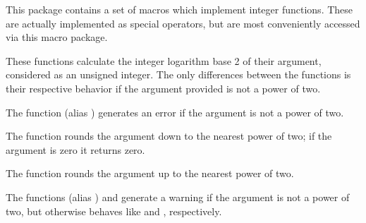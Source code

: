 
This package contains a set of macros which implement integer
functions. These are actually implemented as special operators, but
are most conveniently accessed via this macro package.


These functions calculate the integer logarithm base 2 of their
argument, considered as an unsigned integer. The only differences
between the functions is their respective behavior if the argument
provided is not a power of two.

The function  (alias ) generates
an error if the argument is not a power of two.

The function  rounds the argument down to the nearest
power of two; if the argument is zero it returns zero.

The function  rounds the argument up to the nearest
power of two.

The functions  (alias ) and
 generate a warning if the argument is not a power of
two, but otherwise behaves like  and ,
respectively.
